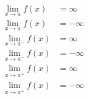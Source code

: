 \begin{equation}
\begin{split}
    \lim_{x \to a} f(x) &= \infty \\
    \lim_{x \to a} f(x) &= -\infty \\
    \lim_{x \to a^{-}} f(x) &= \infty \\
    \lim_{x \to a^{-}} f(x) &= -\infty \\
    \lim_{x \to a^{+}} f(x) &= \infty \\
    \lim_{x \to a^{+}} f(x) &= -\infty
\end{split}
\end{equation}